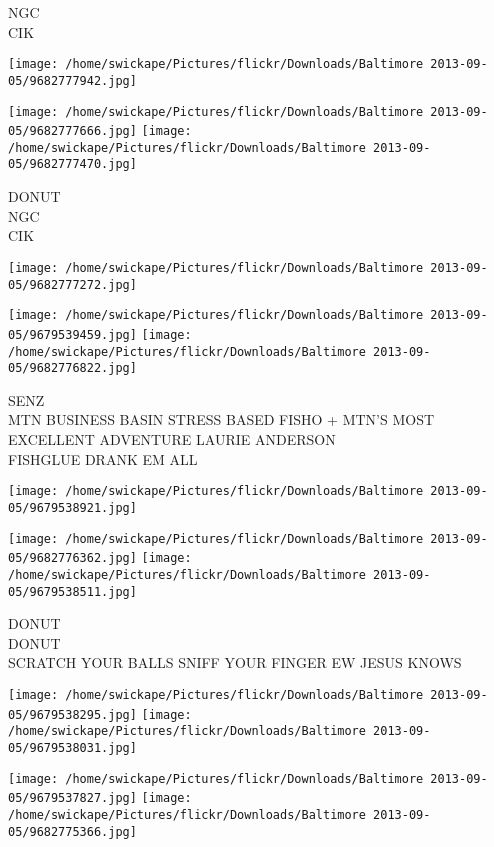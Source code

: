 \documentclass[10pt,letterpaper]{article}
\begin{document}
NGC\\
CIK
\pagebreak

\texttt{[image: /home/swickape/Pictures/flickr/Downloads/Baltimore 2013-09-05/9682777942.jpg]}

\vspace{0.25in}
\texttt{[image: /home/swickape/Pictures/flickr/Downloads/Baltimore 2013-09-05/9682777666.jpg]}
\texttt{[image: /home/swickape/Pictures/flickr/Downloads/Baltimore 2013-09-05/9682777470.jpg]}

DONUT\\
NGC\\
CIK
\pagebreak

\texttt{[image: /home/swickape/Pictures/flickr/Downloads/Baltimore 2013-09-05/9682777272.jpg]}

\vspace{0.25in}
\texttt{[image: /home/swickape/Pictures/flickr/Downloads/Baltimore 2013-09-05/9679539459.jpg]}
\texttt{[image: /home/swickape/Pictures/flickr/Downloads/Baltimore 2013-09-05/9682776822.jpg]}

SENZ\\
MTN BUSINESS BASIN STRESS BASED FISHO + MTN'S MOST EXCELLENT ADVENTURE LAURIE ANDERSON\\
FISHGLUE DRANK EM ALL
\pagebreak

\texttt{[image: /home/swickape/Pictures/flickr/Downloads/Baltimore 2013-09-05/9679538921.jpg]}

\vspace{0.25in}
\texttt{[image: /home/swickape/Pictures/flickr/Downloads/Baltimore 2013-09-05/9682776362.jpg]}
\texttt{[image: /home/swickape/Pictures/flickr/Downloads/Baltimore 2013-09-05/9679538511.jpg]}

DONUT\\
DONUT\\
SCRATCH YOUR BALLS SNIFF YOUR FINGER EW JESUS KNOWS
\pagebreak

\texttt{[image: /home/swickape/Pictures/flickr/Downloads/Baltimore 2013-09-05/9679538295.jpg]}
\texttt{[image: /home/swickape/Pictures/flickr/Downloads/Baltimore 2013-09-05/9679538031.jpg]}

\texttt{[image: /home/swickape/Pictures/flickr/Downloads/Baltimore 2013-09-05/9679537827.jpg]}
\texttt{[image: /home/swickape/Pictures/flickr/Downloads/Baltimore 2013-09-05/9682775366.jpg]}
\end{document}
